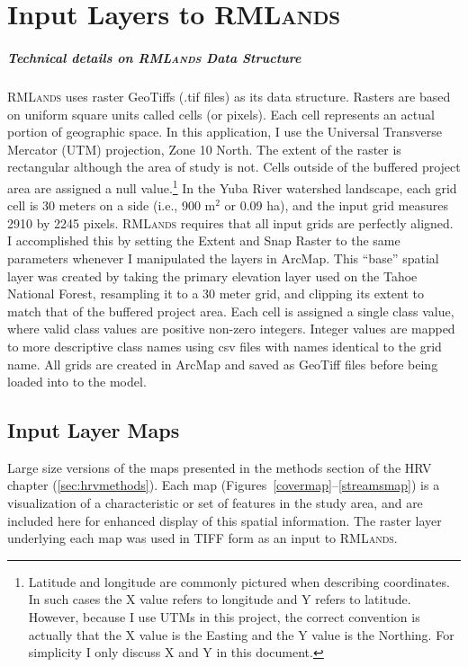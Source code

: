 \appendix


\chapter{Input Layers to \textsc{RMLands}}
\label{app:inputs}

\paragraph*{Technical details on \textsc{RMLands} Data Structure}
\label{app:rmlspecs}
\textsc{RMLands} uses raster GeoTiffs (.tif files) as its data structure. Rasters are based on uniform square units called cells (or pixels). Each cell represents an actual portion of geographic space. In this application, I use the Universal Transverse Mercator (UTM) projection, Zone 10 North. The extent of the raster is rectangular although the area of study is not. Cells outside of the buffered project area are assigned a null value.\footnote{Latitude and longitude are commonly pictured when describing coordinates. In such cases the X value refers to longitude and Y refers to latitude. However, because I use UTMs in this project, the correct convention is actually that the X value is the Easting and the Y value is the Northing. For simplicity I only discuss X and Y  in this document.} In the Yuba River watershed landscape, each grid cell is 30 meters on a side (i.e., 900 m$^2$ or 0.09 ha), and the input grid measures 2910 by 2245 pixels. \textsc{RMLands} requires that all input grids are perfectly aligned. I accomplished this by setting the Extent and Snap Raster to the same parameters whenever I manipulated the layers in ArcMap. This ``base'' spatial layer was created by taking the primary elevation layer used on the Tahoe National Forest, resampling it to a 30 meter grid, and clipping its extent to match that of the buffered project area. Each cell is assigned a single class value, where valid class values are positive non-zero integers. Integer values are mapped to more descriptive class names using csv files with names identical to the grid name. All grids are created in ArcMap and saved as GeoTiff files before being loaded into to the model. 

\section*{Input Layer Maps}
\label{app:sec:inputmaps}

Large size versions of the maps presented in the methods section of the HRV chapter (\ref{sec:hrvmethods}). Each map (Figures~\ref{covermap}--\ref{streamsmap}) is a visualization of a characteristic or set of features in the study area, and are included here for enhanced display of this spatial information. The raster layer underlying each map was used in TIFF form as an input to \textsc{RMLands}.

